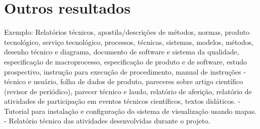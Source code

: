 \documentclass[%
        TwoSidePages,%
        Portuguese,%
        TablesPage,%
        FiguresPage,%
        ]
{ic-tese-v2}
\begin{document}
\chapter{Outros resultados}
Exemplo: Relatórios técnicos, apostila/descrições de métodos, normas, produto tecnológico, serviço tecnológico, processos, técnicas, sistemas, modelos, métodos, desenho técnico e diagrama, documento de software e sistema da qualidade, especificação de macroprocesso, especificação de produto e de software, estudo prospectivo, instrução para execução de procedimento, manual de instruções - técnico e usuário, folha de dados de produto, pareceres sobre artigo científico (revisor de periódico), parecer técnico e laudo, relatório de aferição, relatório de atividades de participação em eventos técnicos científicos, textos didáticos.
- Tutorial para instalação e configuração do sistema de visualização usando mapas. - Relatório técnico das atividades desenvolvidas durante o projeto.

% 
% 
\end{document}
